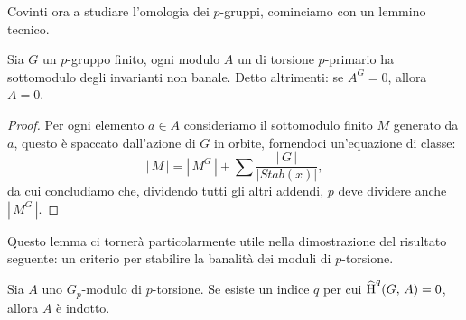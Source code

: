 Covinti ora a studiare l'omologia dei $ p $-gruppi, 
cominciamo con un lemmino tecnico.

\begin{lemma}\label{ban1}
	Sia $ G $ un $ p $-gruppo finito, ogni modulo $ A $ un di torsione $ p $-primario ha sottomodulo degli invarianti non banale. Detto altrimenti: se $ A^G = 0 $, allora $ A = 0 $.
\end{lemma}
\begin{proof}
	Per ogni elemento $ a \in A $ consideriamo il sottomodulo finito $ M $ generato da $ a $, questo è spaccato dall'azione di $ G $ in orbite, fornendoci un'equazione di classe:
	\[ |\,M\,| = |\, M^G\,| +\sum \frac{|\,G\,|}{|Stab(x)|},  \]
	da cui concludiamo che, dividendo tutti gli altri addendi, $ p $ deve dividere anche $ |\, M^G \, | $.
\end{proof}

Questo lemma ci tornerà particolarmente utile nella dimostrazione del risultato seguente: un criterio per stabilire la banalità dei moduli di $ p $-torsione.

\begin{proposition}
	Sia $ A $ uno $ G_p $-modulo di $ p $-torsione. Se esiste un indice $ q $ per cui $ \operatorname{\widehat{H}}^q(G, \, A) = 0 $, allora $ A $ è indotto.
\end{proposition}

